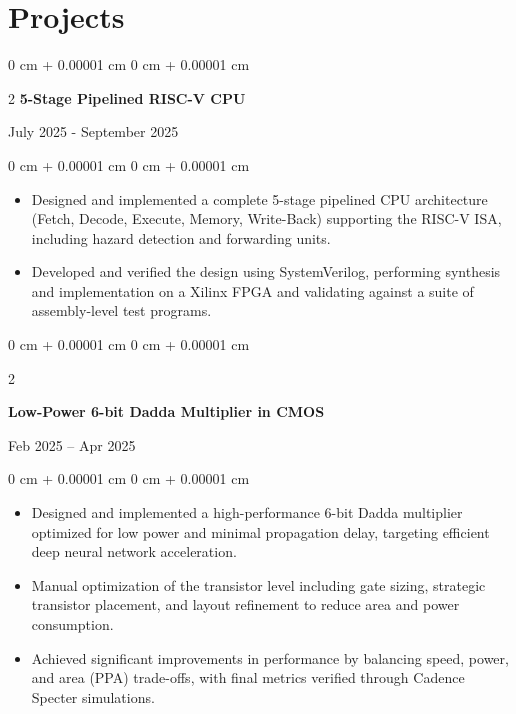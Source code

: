 \documentclass[10pt, letterpaper]{article}
\newenvironment{highlights}{
    \begin{itemize}[
        topsep=0.10 cm,
        parsep=0.10 cm,
        partopsep=0pt,
        itemsep=0pt,
        leftmargin=0 cm + 10pt
    ]
}{
    \end{itemize}
} %
\newenvironment{onecolentry}{
    \begin{adjustwidth}{
        0 cm + 0.00001 cm
    }{
        0 cm + 0.00001 cm
    }
}{
    \end{adjustwidth}
} %
\newenvironment{twocolentry}[2][]{
    \onecolentry
    \def\secondColumn{#2}
    \setcolumnwidth{\fill, 4.5 cm}
    \begin{paracol}{2}
}{
    \switchcolumn \raggedleft \secondColumn
    \end{paracol}
    \endonecolentry
} %
\begin{document}
    \section{Projects}
    
        \begin{twocolentry}{
             July 2025 - September 2025 } \textbf{ 5-Stage Pipelined RISC-V CPU}
        \end{twocolentry}
        \vspace{0.10 cm}
        \begin{onecolentry}
            \begin{highlights}
                \item Designed and implemented a complete 5-stage pipelined CPU architecture (Fetch, Decode, Execute, Memory, Write-Back) supporting the RISC-V ISA, including hazard detection and forwarding units.
                \item Developed and verified the design using SystemVerilog, performing synthesis and implementation on a Xilinx FPGA and validating against a suite of assembly-level test programs.
            \end{highlights}
        \end{onecolentry}

        \vspace{0.2 cm}

        \begin{twocolentry}{
            Feb 2025 – Apr 2025
        }
            \textbf{Low-Power 6-bit Dadda Multiplier in CMOS}
        \end{twocolentry}
        \vspace{0.10 cm}
        \begin{onecolentry}
            \begin{highlights}
                \item Designed and implemented a high-performance 6-bit Dadda multiplier optimized for low power and minimal propagation delay, targeting efficient deep neural network acceleration.
                \item Manual optimization of the transistor level including gate sizing, strategic transistor placement, and layout refinement to reduce area and power consumption.
                \item Achieved significant improvements in performance by balancing speed, power, and area (PPA) trade-offs, with final metrics verified through Cadence Specter simulations.
            \end{highlights}
        \end{onecolentry}
\end{document}
